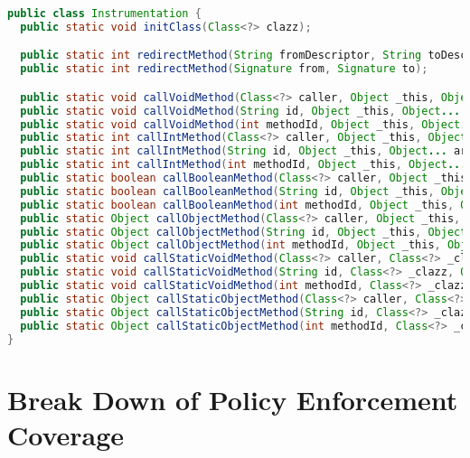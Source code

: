 \documentclass[letterpaper,twocolumn,10pt]{article}
\begin{document}
\begin{lstlisting}[language=Java,basicstyle=\footnotesize,caption={Methods for IRM instrumentation},label={listing:instrumentation}]
public class Instrumentation {
  public static void initClass(Class<?> clazz);

  public static int redirectMethod(String fromDescriptor, String toDescriptor);
  public static int redirectMethod(Signature from, Signature to);

  public static void callVoidMethod(Class<?> caller, Object _this, Object... args);
  public static void callVoidMethod(String id, Object _this, Object... args);
  public static void callVoidMethod(int methodId, Object _this, Object... args);
  public static int callIntMethod(Class<?> caller, Object _this, Object... args);
  public static int callIntMethod(String id, Object _this, Object... args);
  public static int callIntMethod(int methodId, Object _this, Object... args);
  public static boolean callBooleanMethod(Class<?> caller, Object _this, Object... args);
  public static boolean callBooleanMethod(String id, Object _this, Object... args);
  public static boolean callBooleanMethod(int methodId, Object _this, Object... args);
  public static Object callObjectMethod(Class<?> caller, Object _this, Object... args);
  public static Object callObjectMethod(String id, Object _this, Object... args);
  public static Object callObjectMethod(int methodId, Object _this, Object... args);
  public static void callStaticVoidMethod(Class<?> caller, Class<?> _clazz, Object... args);
  public static void callStaticVoidMethod(String id, Class<?> _clazz, Object... args);
  public static void callStaticVoidMethod(int methodId, Class<?> _clazz, Object... args);
  public static Object callStaticObjectMethod(Class<?> caller, Class<?> _clazz, Object... args);
  public static Object callStaticObjectMethod(String id, Class<?> _clazz, Object... args);
  public static Object callStaticObjectMethod(int methodId, Class<?> _clazz, Object... args);
}
\end{lstlisting}



\section{Break Down of Policy Enforcement Coverage}
\label{sec:appendix:coverage}
\end{document}
